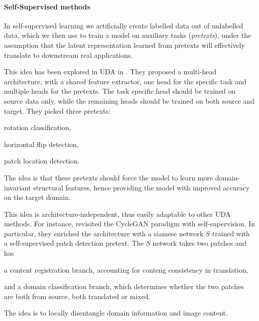 \paragraph{Self-Supervised methods}
In self-supervised learning we artificially create labelled data out of unlabelled data, which we then use to train a model on auxiliary tasks (\emph{pretexts}), under the assumption that the latent representation learned from pretexts will effectively translate to downstream real applications.

This idea has been explored in UDA in \cite[Sun et al.]{Sun2019}. They proposed a multi-head architecture, with a shared feature extractor, one head for the specific task and multiple heads for the pretexts. The task specific head should be trained on source data only, while the remaining heads should be trained on both source and target. They picked three pretexts:
\begin{enumerate*}[label=(\roman*)]
    \item rotation classification,
    \item horizontal flip detection,
    \item patch location detection.
\end{enumerate*}
The idea is that these pretexts should force the model to learn more domain-invariant structural features, hence providing the model with improved accuracy on the target domain.

This idea is architecture-independent, thus easily adaptable to other UDA methods. For instance, \cite[Xie et al.]{Xie2020} revisited the CycleGAN \cite{Hoffman2017} paradigm with self-supervision. In particular, they enriched the architecture with a siamese network \(S\) trained with a self-supervised patch detection pretext. The \(S\) network takes two patches and has 
\begin{enumerate*}[label=(\roman*)]
    \item a content registration branch, accounting for conteng consistency in translation, 
    \item and a domain classification branch, which determines whether the two patches are both from source, both translated or mixed.
\end{enumerate*}
The idea is to locally disentangle domain information and image content.